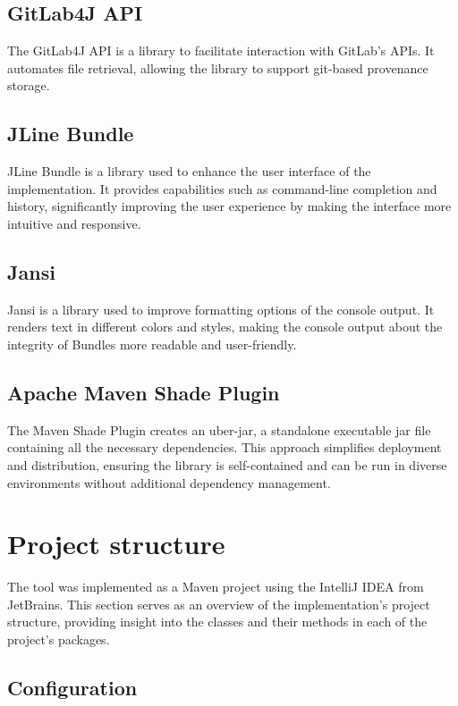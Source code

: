 \documentclass[
  digital,     %
  oneside,     %
  nosansbold,  %
  nocolorbold, %
  lof,         %
  lot,         %
]{fithesis4}
\begin{document}
\subsection{GitLab4J API}
The GitLab4J API \cite{gitapi} is a library to facilitate interaction with GitLab's APIs. It automates file retrieval, allowing the library to support git-based provenance storage.
\subsection{JLine Bundle}
JLine Bundle \cite{jline} is a library used to enhance the user interface of the implementation. It provides capabilities such as command-line completion and history, significantly improving the user experience by making the interface more intuitive and responsive.
\subsection{Jansi}
Jansi \cite{jansi} is a library used to improve formatting options of the console output. It renders text in different colors and styles, making the console output about the integrity of Bundles more readable and user-friendly.
\subsection{Apache Maven Shade Plugin}
The Maven Shade Plugin \cite{maven-shade} creates an uber-jar, a standalone executable jar file containing all the necessary dependencies. This approach simplifies deployment and distribution, ensuring the library is self-contained and can be run in diverse environments without additional dependency management.
\section*{}


\section{Project structure}
The tool was implemented as a Maven project using the IntelliJ IDEA from JetBrains. This section serves as an overview of the implementation's project structure, providing insight into the classes and their methods in each of the project's packages.

\newpage
\subsection{Configuration}
\vskip 0.35cm
\end{document}
